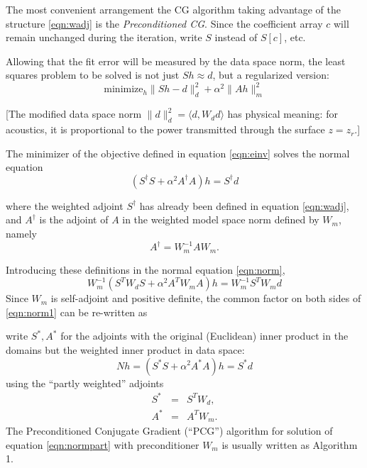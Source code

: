 The most convenient arrangement the CG algorithm taking advantage of the structure \ref{eqn:wadj} is the {\em Preconditioned CG}. Since the coefficient array $c$ will remain unchanged during the iteration, write $S$ instead of $S[c]$, etc. 

Allowing that the fit error will be measured by the data space norm, the least squares problem to be solved is not just $Sh \approx d$, but a regularized version:
\begin{equation}
  \label{eqn:einv}
  \mbox{minimize}_h \|Sh-d\|^2_d + \alpha^2 \|Ah\|^2_m
\end{equation}

[The modified data space norm $\|d\|_d^2 = \langle d, W_d d\rangle$ has physical meaning: for acoustics, it is proportional to the power transmitted through the surface $z=z_r$.]

The minimizer of the objective defined in equation \ref{eqn:einv} solves the normal equation
\begin{equation}
  \label{eqn:norm}
  (S^{\dagger}S + \alpha^2 A^{\dagger}A)h = S^{\dagger}d 
\end{equation}

where the weighted adjoint $S^{\dagger}$ has already been defined in equation \ref{eqn:wadj}, and $A^{\dagger}$ is the adjoint of $A$ in the weighted model space norm defined by $W_m$, namely
\begin{equation}
  \label{eqn:aadj}
  A^{\dagger} = W_m^{-1}A W_m.
\end{equation}

Introducing these definitions in the normal equation \ref{eqn:norm},
\begin{equation}
  \label{eqn:norm1}
  W_m^{-1}(S^TW_dS + \alpha^2 A^TW_mA)h = W_m^{-1}S^TW_md 
\end{equation}
Since $W_m$ is self-adjoint and positive definite, the common factor on both sides of \ref{eqn:norm1} can be re-written as

write $S^*, A^*$ for the adjoints with the original (Euclidean) inner product in the domains but the weighted inner product in data space:
\begin{equation}
  \label{eqn:normpart}
  Nh = (S^*S + \alpha^2 A^*A)h = S^*d 
\end{equation}
using the ``partly weighted'' adjoints
\begin{eqnarray}
  \label{eqn:sadj}
  S^* &=& S^T W_d,\\
  A^* &=& A^T W_m.
\end{eqnarray}
The Preconditioned Conjugate Gradient (``PCG'') algorithm for solution of equation \ref{eqn:normpart} with preconditioner $W_m$ is usually written as Algorithm 1.

